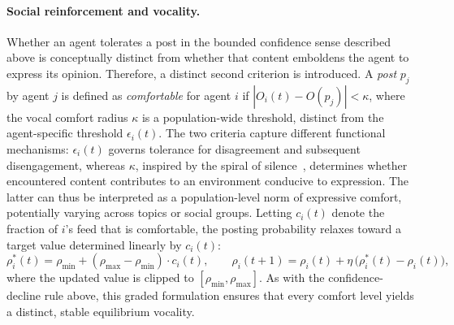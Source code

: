 \documentclass{svproc}
\def\post{\rho}                 %
\def\BoundedConfidence{\epsilon} %
\def\VCR{\kappa}                 %
\begin{document}
\paragraph{Social reinforcement and vocality.} 
Whether an agent tolerates a post in the bounded confidence sense
described above is conceptually distinct from whether that content
emboldens the agent to express its opinion. Therefore, a distinct
second criterion is introduced. A {\em post} $p_j$ by agent $j$ is
defined as {\em comfortable} for agent $i$ if $|O_i(t)-O(p_j)|<\VCR$, where the vocal comfort
radius $\VCR$ is a population-wide threshold, distinct
from the agent-specific threshold $\BoundedConfidence_i(t)$. The two
criteria capture different functional mechanisms:
$\BoundedConfidence_i(t)$ governs tolerance for disagreement 
and subsequent disengagement, whereas
$\VCR$, inspired by the spiral of silence~\cite{noelle-neumann1974}, 
determines whether encountered content contributes to an 
environment conducive to expression.
The latter can thus be interpreted as a population-level 
norm of expressive comfort, potentially varying across 
topics or social groups.
Letting $c_i(t)$ denote the fraction of $i$'s feed that is
comfortable, the posting probability relaxes toward a target value
determined linearly by $c_i(t)$:
%
\begin{equation}\label{eq:social-reinforcement}
\post_i^{\ast}(t) = \post_{\min} + (\post_{\max}-\post_{\min})\cdot c_i(t), \qquad
\post_i(t{+}1) = \post_i(t) + \eta\,\big(\post_i^{\ast}(t)-\post_i(t)\big),
\end{equation}
%
where the updated value is clipped to
$[\post_{\min},\post_{\max}]$. As with the confidence-decline rule
above, this graded formulation ensures that every comfort level yields
a distinct, stable equilibrium vocality.
\par
\end{document}
